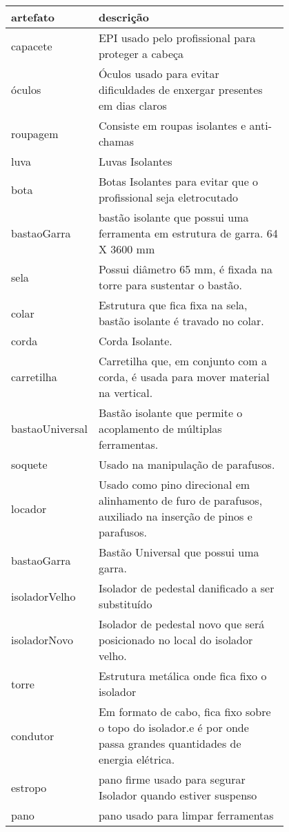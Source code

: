 \begin{table}[H]
\centering
\begin{tabular}{|l|p{0.8\linewidth}|}
\hline
\textbf{artefato} & \textbf{descrição} \\ \hline
capacete & EPI usado pelo profissional para proteger a cabeça \\ \hline
óculos & Óculos usado para evitar dificuldades de enxergar presentes em dias claros \\ \hline
roupagem & Consiste em roupas isolantes e anti-chamas \\ \hline
luva & Luvas Isolantes \\ \hline
bota & Botas Isolantes para evitar que o profissional seja eletrocutado \\ \hline
bastaoGarra & bastão isolante que possui uma ferramenta em estrutura de garra. 64 X 3600 mm \\ \hline
sela & Possui diâmetro 65 mm, é fixada na torre para sustentar o bastão. \\ \hline
colar & Estrutura que fica fixa na sela, bastão isolante é travado no colar. \\ \hline
corda & Corda Isolante. \\ \hline
carretilha & Carretilha que, em conjunto com a corda, é usada para mover material na vertical. \\ \hline
bastaoUniversal & Bastão isolante que permite o acoplamento de múltiplas ferramentas. \\ \hline
soquete & Usado na manipulação de parafusos. \\ \hline
locador & Usado como pino direcional em alinhamento de furo de parafusos, auxiliado na inserção de pinos e parafusos. \\ \hline
bastaoGarra & Bastão Universal que possui uma garra. \\ \hline
isoladorVelho & Isolador de pedestal danificado a ser substituído \\ \hline
isoladorNovo & Isolador de pedestal novo que será posicionado no local do isolador velho. \\ \hline
torre & Estrutura metálica onde fica fixo o isolador \\ \hline
condutor & Em formato de cabo, fica fixo sobre o topo do isolador.e é por onde passa grandes quantidades de energia elétrica. \\ \hline
estropo & pano firme usado para segurar Isolador quando estiver suspenso \\ \hline
pano & pano usado para limpar ferramentas \\ \hline

\end{tabular}
\end{table}
